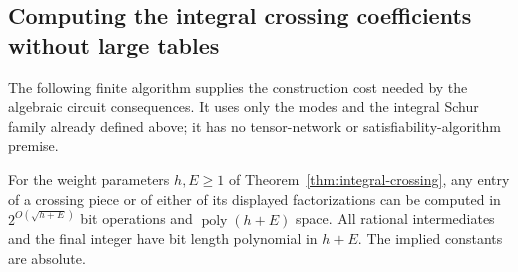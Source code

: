 \subsection{Computing the integral crossing coefficients without large tables}
\label{sec:algebraic-streaming-coefficients}

The following finite algorithm supplies the construction cost needed
by the algebraic circuit consequences.  It uses only the modes and
the integral Schur family already defined above; it has no
tensor-network or satisfiability-algorithm premise.

\begin{lemma}
\label{lem:algebraic-coefficient-computation}
For the weight parameters $h,E\ge1$ of
Theorem~\ref{thm:integral-crossing}, any entry of a crossing piece
or of either of its displayed factorizations can be computed in
$2^{O(\sqrt{h+E})}$ bit operations and
$\operatorname{poly}(h+E)$ space.  All rational intermediates and
the final integer have bit length polynomial in $h+E$.
The implied constants are absolute.
\end{lemma}

